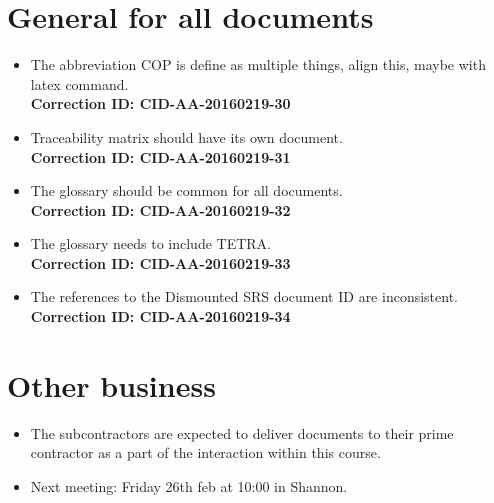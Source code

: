 \section*{General for all documents}
\begin{itemize}
    \item The abbreviation COP is define as multiple things, align this, maybe with latex command. \\ \textbf{Correction ID: CID-AA-20160219-30} 
    \item Traceability matrix should have its own document. \\ \textbf{Correction ID: CID-AA-20160219-31}
    \item The glossary should be common for all documents. \\ \textbf{Correction ID: CID-AA-20160219-32}
    \item The glossary needs to include TETRA. \\ \textbf{Correction ID: CID-AA-20160219-33} 
    \item The references to the Dismounted SRS document ID are inconsistent.
    \\ \textbf{Correction ID: CID-AA-20160219-34}
\end{itemize}



\section*{Other business}
\begin{itemize}
    \item The subcontractors are expected to deliver documents to their prime contractor as a part of the interaction within this course. \\
    \item Next meeting: Friday 26th feb at 10:00 in Shannon.
\end{itemize}

